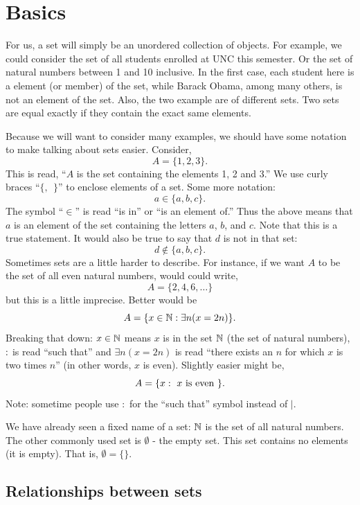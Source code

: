 \documentclass[12pt]{article}
\begin{document}
\newpage

\section{Basics}

For us, a set will simply be an unordered collection of objects.  For example, we could consider the set of all students enrolled at UNC this semester.  Or the set of natural numbers between 1 and 10 inclusive.  In the first case, each student here is a element (or member) of the set, while Barack Obama, among many others, is not an element of the set.  Also, the two example are of different sets.  Two sets are equal exactly if they contain the exact same elements.

Because we will want to consider many examples, we should have some notation to make talking about sets easier.  Consider,
\[ A = \{1, 2, 3\}.\]
This is read, ``$A$ is the set containing the elements 1, 2 and 3.''  We use curly braces ``$\{,~~ \}$'' to enclose elements of a set.  Some more notation:
\[ a \in \{a, b, c\}. \]
The symbol ``$\in$'' is read ``is in'' or ``is an element of.''  Thus the above means that $a$ is an element of the set containing the letters $a$, $b$, and $c$.  Note that this is a true statement.  It would also be true to say that $d$ is not in that set:
\[ d \not\in \{a, b, c\}.\]
Sometimes sets are a little harder to describe.  For instance, if we want $A$ to be the set of all even natural numbers, would could write,
\[ A = \{2, 4, 6, \ldots\}\]
but this is a little imprecise.  Better would be
\[ A = \{x \in \mathbb N : \exists n ( x = 2 n)\}.\]
Breaking that down: $x \in \mathbb N$ means $x$ is in the set $\mathbb N$ (the set of natural numbers), $:$ is read ``such that'' and $\exists n (x = 2n)$ is read ``there exists an $n$ for which $x$ is two times $n$'' (in other words, $x$ is even).  Slightly easier might be,
\[ A = \{x : \mbox{ $x$ is even }\}. \]
Note: sometime people use $:$ for the ``such that'' symbol instead of $|$.

We have already seen a fixed name of a set: $\mathbb N$ is the set of all natural numbers.  The other commonly used set is $\emptyset$ - the empty set.  This set contains no elements (it is empty).  That is, $\emptyset = \{ \}$.



\subsection{Relationships between sets}
\end{document}
